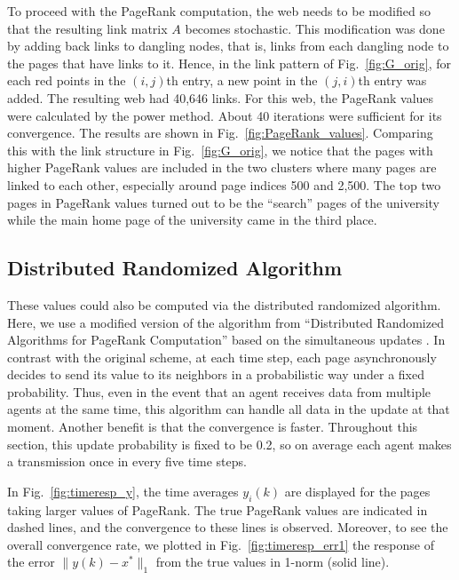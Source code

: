 \documentclass[11pt,draftcls,onecolumn]{IEEEtran}
\begin{document}
To proceed with the PageRank computation, the web needs to be modified
so that the resulting link matrix $A$ becomes stochastic. 
This modification was done by adding back links to dangling nodes, that is, links from each dangling 
node to the pages that have links to it. 
Hence, in the link pattern of Fig.~\ref{fig:G_orig},
for each red points in the $(i,j)$th entry, a new point in the $(j,i)$th entry was added.
The resulting web had 40,646 links.
For this web, the PageRank values were calculated by the power method. 
About 40 iterations were sufficient for its convergence. 
The results are shown in Fig.~\ref{fig:PageRank_values}. Comparing this with the
link structure in Fig.~\ref{fig:G_orig}, we notice that the pages with higher PageRank
values are included in the two clusters where many pages are linked to each other,
especially around page indices 500 and 2,500.
The top two pages in PageRank values turned out to be the ``search'' pages of the university
while the main home page of the university came in the third place. 



\subsection*{Distributed Randomized Algorithm}

These values could also be computed via the distributed randomized algorithm.
Here, we use a modified version of the algorithm from 
``Distributed Randomized Algorithms for PageRank Computation''
based on the simultaneous updates \cite{IshTem:10}. 
In contrast with the original scheme,  
at each time step,
each page asynchronously decides to send its value to its neighbors 
in a probabilistic way under a fixed probability. 
Thus, even in the event that an agent receives data from
multiple agents at the same time, this algorithm can handle all data in
the update at that moment.
Another benefit is that the convergence is faster. 
Throughout this section, this update
probability is fixed to be 0.2, so on average each agent makes a transmission
once in every five time steps. 


In Fig.~\ref{fig:timeresp_y}, the time averages $y_i(k)$
are displayed for the pages taking larger values of PageRank. The true PageRank values
are indicated in dashed lines, and the convergence to these lines is observed.
Moreover, to see the overall convergence rate, we plotted in Fig.~\ref{fig:timeresp_err1}
the response of the error $\|y(k)-x^*\|_1$ from the true values in 1-norm (solid line).
\end{document}
